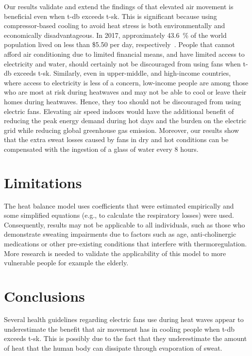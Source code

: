 Our results validate and extend the findings of  that elevated air movement is beneficial even when \ac{t-db} exceeds \acf{t-sk}.
This is significant because using compressor-based cooling to avoid heat stress is both environmentally and economically disadvantageous.
In 2017, approximately 43.6~\% of the world population lived on less than \$5.50 per day, respectively~\cite{PovertyO1:online}.
People that cannot afford air conditioning due to limited financial means, and have limited access to electricity and water, should certainly not be discouraged from using fans when \ac{t-db} exceeds \ac{t-sk}.
Similarly, even in upper-middle, and high-income countries, where access to electricity is less of a concern, low-income people are among those who are most at risk during heatwaves and may not be able to cool or leave their homes during heatwaves.
Hence, they too should not be discouraged from using electric fans.
Elevating air speed indoors would have the additional benefit of reducing the peak energy demand during hot days and the burden on the electric grid while reducing global greenhouse gas emission.
Moreover, our results show that the extra sweat losses caused by fans in dry and hot conditions can be compensated with the ingestion of a glass of water every 8 hours.

\section*{Limitations}
The  heat balance model uses coefficients that were estimated empirically and some simplified equations (e.g., to calculate the respiratory losses) were used.
Consequently, results may not be applicable to all individuals, such as those who demonstrate sweating impairments due to factors such as age, anti-cholinergic medications or other pre-existing conditions that interfere with thermoregulation.
More research is needed to validate the applicability of this model to more vulnerable people for example the elderly.

\section{Conclusions}\label{sec:conclusions}
Several health guidelines regarding electric fans use during heat waves appear to underestimate the benefit that air movement has in cooling people when \acf{t-db} exceeds \acf{t-sk}.
This is possibly due to the fact that they underestimate the amount of heat that the human body can dissipate through evaporation of sweat.

